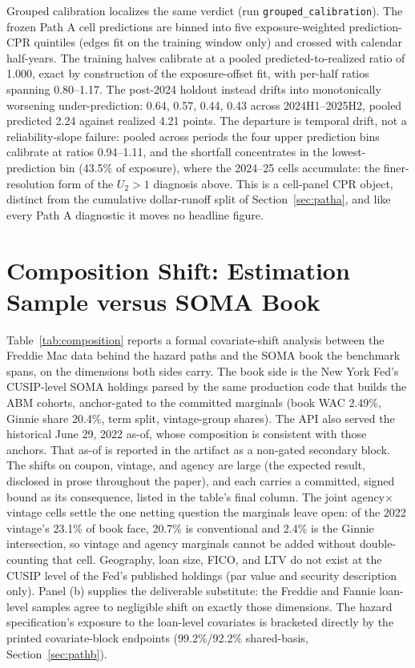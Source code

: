 \documentclass[12pt]{article}
\begin{document}
Grouped calibration localizes the same verdict (run \texttt{grouped\_calibration}). The frozen Path A cell predictions are binned into five exposure-weighted prediction-CPR quintiles (edges fit on the training window only) and crossed with calendar half-years. The training halves calibrate at a pooled predicted-to-realized ratio of 1.000, exact by construction of the exposure-offset fit, with per-half ratios spanning 0.80--1.17. The post-2024 holdout instead drifts into monotonically worsening under-prediction: 0.64, 0.57, 0.44, 0.43 across 2024H1--2025H2, pooled predicted 2.24 against realized 4.21 points. The departure is temporal drift, not a reliability-slope failure: pooled across periods the four upper prediction bins calibrate at ratios 0.94--1.11, and the shortfall concentrates in the lowest-prediction bin (43.5\% of exposure), where the 2024--25 cells accumulate: the finer-resolution form of the $U_2 > 1$ diagnosis above. This is a cell-panel CPR object, distinct from the cumulative dollar-runoff split of Section~\ref{sec:patha}, and like every Path A diagnostic it moves no headline figure.

\section{Composition Shift: Estimation Sample versus SOMA Book}\label{app:composition}

Table~\ref{tab:composition} reports a formal covariate-shift analysis between the Freddie Mac data behind the hazard paths and the SOMA book the benchmark spans, on the dimensions both sides carry. The book side is the New York Fed's CUSIP-level SOMA holdings parsed by the same production code that builds the ABM cohorts, anchor-gated to the committed marginals (book WAC 2.49\%, Ginnie share 20.4\%, term split, vintage-group shares). The API also served the historical June 29, 2022 as-of, whose composition is consistent with those anchors. That as-of is reported in the artifact as a non-gated secondary block. The shifts on coupon, vintage, and agency are large (the expected result, disclosed in prose throughout the paper), and each carries a committed, signed bound as its consequence, listed in the table's final column. The joint agency$\times$vintage cells settle the one netting question the marginals leave open: of the 2022 vintage's 23.1\% of book face, 20.7\% is conventional and 2.4\% is the Ginnie intersection, so vintage and agency marginals cannot be added without double-counting that cell. Geography, loan size, FICO, and LTV do not exist at the CUSIP level of the Fed's published holdings (par value and security description only). Panel (b) supplies the deliverable substitute: the Freddie and Fannie loan-level samples agree to negligible shift on exactly those dimensions. The hazard specification's exposure to the loan-level covariates is bracketed directly by the printed covariate-block endpoints (99.2\%/92.2\% shared-basis, Section~\ref{sec:pathb}).
\end{document}
